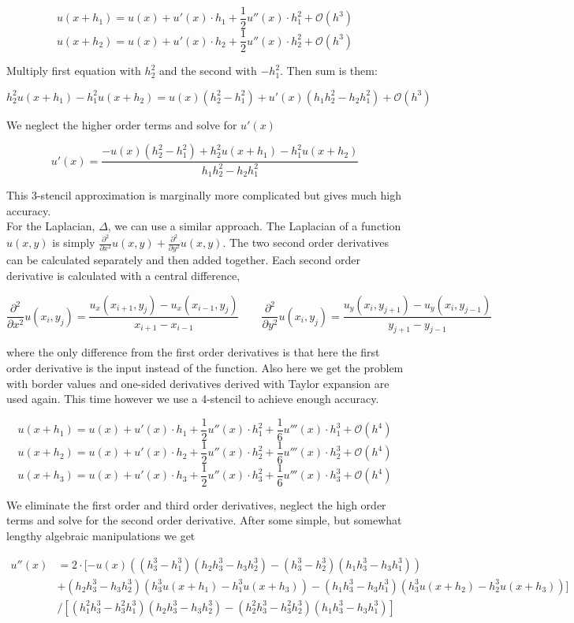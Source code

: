 \documentclass[paper=a4, fontsize=12pt]{article} %
\begin{document}
$$u(x+h_1) = u(x) + u'(x)\cdot h_1 + \frac{1}{2}u''(x)\cdot h_1^2 + \mathcal{O}(h^3)$$
$$u(x+h_2) = u(x) + u'(x)\cdot h_2 + \frac{1}{2}u''(x)\cdot h_2^2 + \mathcal{O}(h^3)$$

Multiply first equation with $h_2^2$ and the second with $-h_1^2$. Then sum is them:

$$ h_2^2 u(x+h_1)  - h_1^2 u(x+h_2)  = u(x) (h_2^2 - h_1^2 ) + u'(x) (h_1 h_2^2 - h_2 h_ 1^2) +  \mathcal{O}(h^3) $$

We neglect the higher order terms and solve for $u'(x)$

$$  u'(x) = \frac{- u(x) (h_2^2 - h_1^2 ) + h_2^2 u(x+h_1)  - h_1^2 u(x+h_2) }{h_1 h_2^2 - h_2 h_ 1^2}  $$

This 3-stencil approximation is marginally more complicated but gives much high accuracy. \\


For the Laplacian, $\Delta$, we can use a similar approach. The Laplacian of a function $u(x,y) $ is simply $\frac{\partial^2}{\partial x^2} u(x,y) + \frac{\partial^2}{\partial y^2} u(x,y) $. The two second order derivatives can be calculated separately and then added together. Each second order derivative is calculated with a central difference,

$$ \frac{\partial^2}{\partial x^2} u(x_i,y_j)  = \frac{u_x(x_{i+1},y_j)-u_x(x_{i-1},y_j)}{x_{i+1} - x_{i-1}} \qquad  \frac{\partial^2}{\partial y^2} u(x_i,y_j)  = \frac{u_y(x_{i},y_{j+1})-u_y(x_{i},y_{j-1})}{y_{j+1} - y_{j-1}}$$

where the only difference from the first order derivatives is that here the first order derivative is the input instead of the function. Also here we get the problem with border values and one-sided derivatives derived with Taylor expansion are used again. This time however we use a 4-stencil to achieve enough accuracy.

$$u(x+h_1) = u(x) + u'(x)\cdot h_1 + \frac{1}{2}u''(x)\cdot h_1^2 + \frac{1}{6}u'''(x)\cdot h_1^3 + \mathcal{O}(h^4)$$
$$u(x+h_2) = u(x) + u'(x)\cdot h_2 + \frac{1}{2}u''(x)\cdot h_2^2 + \frac{1}{6}u'''(x)\cdot h_2^3 + \mathcal{O}(h^4)$$
$$u(x+h_3) = u(x) + u'(x)\cdot h_3 + \frac{1}{2}u''(x)\cdot h_3^2 + \frac{1}{6}u'''(x)\cdot h_3^3 + \mathcal{O}(h^4)$$

We eliminate the first order and third order derivatives, neglect the high order terms and solve for the second order derivative. After some simple, but somewhat lengthy algebraic manipulations we get

\begin{align*}
u''(x) &= 2\cdot [ -u(x)((h_3^3 - h_1^3)(h_2h_3^3 - h_3h_2^3)-(h_3^3-h_2^3)(h_1h_3^3-h_3h_1^3))  \\
& + (h_2h_3^3 - h_3h_2^3)(h_3^3u(x+h_1)-h_1^3u(x+h_3))  - (h_1h_3^3 - h_3h_1^3 )(h_3^3 u(x+h_2) -h_2^3 u(x+h_3)) ]\\
&  /  [(h_1^2 h_3^3 - h_3^2 h_1^3 )(h_2 h_3^3 - h_3 h_2^3 )-( h_2^2 h_3^3 - h_3^2 h_2^3 )(h_1 h_3^3 - h_3 h_1^3) ]
\end{align*}
\end{document}
